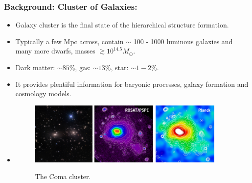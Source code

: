 \documentclass[aspectratio=43]{beamer}
\begin{document}
\begin{frame}
  \frametitle{Background: Cluster of Galaxies:}
    \begin{itemize}
      \item<1-> Galaxy cluster is the final state of the hierarchical structure formation.
      \item<2-> Typically a few Mpc across, contain $\sim$ 100 - 1000 luminous galaxies and many more dwarfs, masses $\gtrsim 10^{14.5} M_{\odot}$.
      \item<3-> Dark matter: $\sim 85 \%$, gas: $\sim 13 \%$, star: $\sim 1 - 2 \%$.
      \item<4-> It provides plentiful information for baryonic processes, galaxy formation and cosmology models.
      \item<5->[]
        \begin{figure}
          \includegraphics[width=0.292\textwidth]{Coma-SDSS.jpg}
          \includegraphics[width=0.3\textwidth]{Coma-Rosat.pdf}
          \includegraphics[width=0.3\textwidth]{Coma-Planck.pdf}
          \vspace{-0.4cm}
          \caption{The Coma cluster.}
        \end{figure}
    \end{itemize}
\end{frame}
\end{document}
